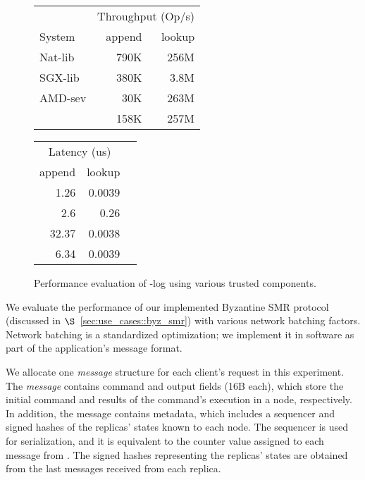 \begin{figure}[t!]
\begin{center}
  \centering
\begin{tabular}{lrr}
\hline
& \multicolumn{2}{c}{Throughput (Op/s)} \\
System          & append    & lookup  \\
\hline
Nat-lib         & 790K      & 256M      \\
SGX-lib             & 380K      & 3.8M       \\
AMD-sev         & 30K       & 263M      \\
\projecttitle{} & 158K      & 257M      \\
\end{tabular}
\endminipage
\hfill
{}
\centering
\begin{tabular}{rrr}
\hline
\multicolumn{2}{c}{Latency (us)} \\
 append     & lookup  \\
\hline
 1.26       & 0.0039      \\
 2.6        & 0.26       \\
 32.37      & 0.0038      \\
 6.34       & 0.0039      \\
 
\end{tabular}
\endminipage
\end{center}
\caption{Performance evaluation of \projecttitle{}-log using various trusted components.}%
\label{fig:a2m_eval}
\end{figure}

We evaluate the performance of our implemented Byzantine SMR protocol (discussed in $\S$~\ref{sec:use_cases::byz_smr}) with various network batching factors. Network batching is a standardized optimization; we implement it in software as part of the application's message format. 

We allocate one {\em message} structure for each client's request in this experiment. The {\em message} contains command and output fields (16B each), which store the initial command and results of the command's execution in a node, respectively. In addition, the message contains metadata, which includes a sequencer and signed hashes of the replicas' states known to each node. The sequencer is used for serialization, and it is equivalent to the counter value assigned to each message from \projecttitle{}. The signed hashes representing the replicas' states are obtained from the last messages received from each replica.

